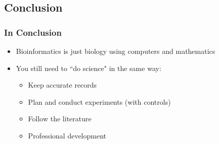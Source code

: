 
\subsection{Conclusion}
\begin{frame}
  \frametitle{In Conclusion}
  \begin{itemize}
    \item Bioinformatics is just biology using computers and mathematics
    \item You still need to ``do science" in the same way:
    \begin{itemize}
      \item Keep accurate records
      \item Plan and conduct experiments (with controls)
      \item Follow the literature
      \item Professional development
    \end{itemize}
  \end{itemize}
\end{frame}
